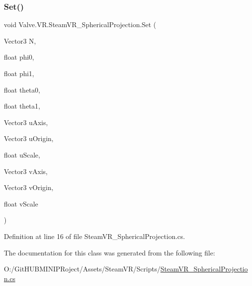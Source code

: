\subsubsection{\texorpdfstring{Set()}{Set()}}
{\footnotesize\ttfamily void Valve.\+V\+R.\+Steam\+V\+R\+\_\+\+Spherical\+Projection.\+Set (\begin{DoxyParamCaption}\item[{Vector3}]{N,  }\item[{float}]{phi0,  }\item[{float}]{phi1,  }\item[{float}]{theta0,  }\item[{float}]{theta1,  }\item[{Vector3}]{u\+Axis,  }\item[{Vector3}]{u\+Origin,  }\item[{float}]{u\+Scale,  }\item[{Vector3}]{v\+Axis,  }\item[{Vector3}]{v\+Origin,  }\item[{float}]{v\+Scale }\end{DoxyParamCaption})}



Definition at line 16 of file Steam\+V\+R\+\_\+\+Spherical\+Projection.\+cs.



The documentation for this class was generated from the following file\+:\begin{DoxyCompactItemize}
\item 
O\+:/\+Git\+H\+U\+B\+M\+I\+N\+I\+P\+Roject/\+Assets/\+Steam\+V\+R/\+Scripts/\mbox{\hyperlink{_steam_v_r___spherical_projection_8cs}{Steam\+V\+R\+\_\+\+Spherical\+Projection.\+cs}}\end{DoxyCompactItemize}

